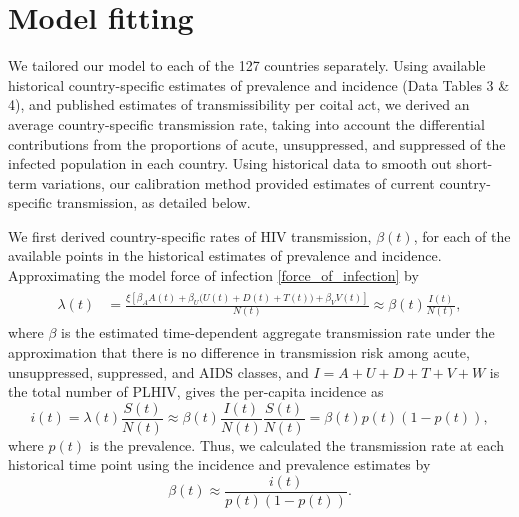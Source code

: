 \documentclass{article}
\begin{document}
\section{Model fitting}
\label{model_fitting}

We tailored our model to each of the 127 countries separately.  Using
available historical country-specific estimates of prevalence and
incidence (Data Tables 3 \& 4), and published estimates of
transmissibility per coital
act,\cite{Wawer2005-us, Donnell2010-xo, Hughes2012-so,
  Skarbinski2015-ni}
we derived an average country-specific transmission rate, taking into
account the differential contributions from the proportions of acute,
unsuppressed, and suppressed of the infected population in each
country.  Using historical data to smooth out short-term variations,
our calibration method provided estimates of current country-specific
transmission, as detailed below.

We first derived country-specific rates of HIV transmission,
$\beta(t)$, for each of the available points in the historical
estimates of prevalence and incidence.  Approximating the model
force of infection \eqref{force_of_infection} by
\begin{align}
  \label{foi}
  \begin{split}
    \lambda(t) &= \frac{\xi \left[\beta_{A} A(t)
        + \beta_{U} \big(U(t) + D(t) + T(t)\big) +
        \beta_{V} V(t)\right]}{N(t)}
    \approx  \beta(t) \frac{I(t)}{N(t)},
  \end{split}
\end{align}
where $\beta$ is the estimated time-dependent aggregate transmission
rate under the approximation that there is no difference in
transmission risk among acute, unsuppressed, suppressed, and AIDS
classes, and $I = A + U + D + T + V + W$ is the total number of PLHIV,
gives the per-capita incidence as
\begin{equation}
i(t) = \lambda(t) \frac{S(t)}{N(t)}
\approx \beta(t) \frac{I(t)}{N(t)} \frac{S(t)}{N(t)} =\beta(t) p(t) (1-p(t)),
\end{equation}
where $p(t)$ is the prevalence. Thus, we calculated the transmission
rate at each historical time point using the incidence and prevalence
estimates by
\begin{equation}
  \label{trans_rate}
  \beta(t) \approx \frac{i(t)}{p(t)(1-p(t))}.
\end{equation}
\end{document}
